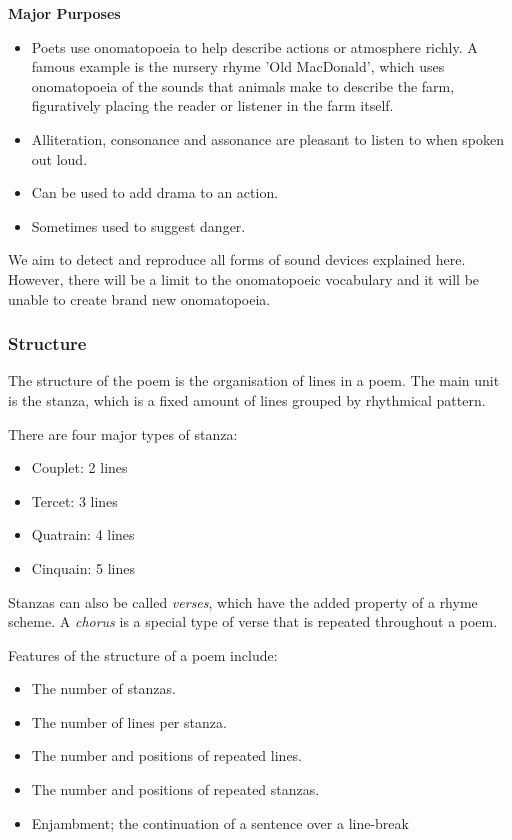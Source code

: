 \textbf{Major Purposes}
\begin{itemize}
\item{Poets use onomatopoeia to help describe actions or atmosphere richly. A famous example is the nursery rhyme 'Old MacDonald', which uses onomatopoeia of the sounds that animals make to describe the farm, figuratively placing the reader or listener in the farm itself.} 
\item{Alliteration, consonance and assonance are pleasant to listen to when spoken out loud.}
\item{Can be used to add drama to an action.}
\item{Sometimes used to suggest danger.}
\end{itemize}

We aim to detect and reproduce all forms of sound devices explained here. However, there will be a limit to the onomatopoeic vocabulary and it will be unable to create brand new onomatopoeia.

\subsubsection{Structure}
\label{sec:structure}
The structure of the poem is the organisation of lines in a poem. The main unit is the stanza, which is a fixed amount of lines grouped by rhythmical pattern.

There are four major types of stanza:
\begin{itemize}
\item{Couplet: 2 lines}
\item{Tercet: 3 lines}
\item{Quatrain: 4 lines}
\item{Cinquain: 5 lines}
\end{itemize}

Stanzas can also be called \textit{verses}, which have the added property of a rhyme scheme. A \textit{chorus} is a special type of verse that is repeated throughout a poem.

Features of the structure of a poem include:
\begin{itemize}
\item{The number of stanzas.}
\item{The number of lines per stanza.}
\item{The number and positions of repeated lines.}
\item{The number and positions of repeated stanzas.}
\item{Enjambment; the continuation of a sentence over a line-break}
\end{itemize} 

